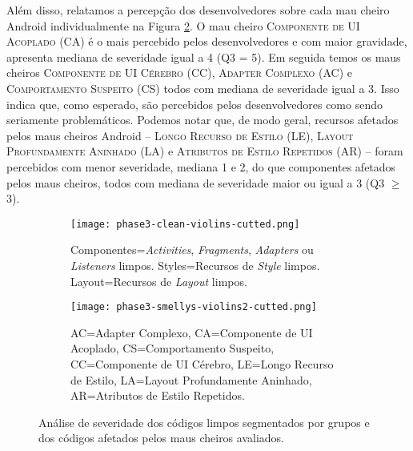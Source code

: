 Além disso, relatamos a percepção dos desenvolvedores sobre cada mau cheiro Android individualmente na Figura \ref{fig:smellys-violins}. O mau cheiro \textsc{\small Componente de UI Acoplado} (CA) é o mais percebido pelos desenvolvedores e com maior gravidade, apresenta mediana de severidade igual a 4 (Q3 = 5). Em seguida temos os maus cheiros \textsc{\small Componente de UI Cérebro} (CC), \textsc{\small Adapter Complexo} (AC) e \textsc{\small Comportamento Suspeito} (CS) todos com mediana de severidade igual a 3. Isso indica que, como esperado, são percebidos pelos desenvolvedores como sendo seriamente problemáticos. Podemos notar que, de modo geral, recursos afetados pelos maus cheiros Android -- \textsc{\small Longo Recurso de Estilo} (LE), \textsc{\small Layout Profundamente Aninhado} (LA) e \textsc{\small Atributos de Estilo Repetidos} (AR) -- foram percebidos com menor severidade, mediana 1 e 2, do que componentes afetados pelos maus cheiros, todos com mediana de severidade maior ou igual a 3 (Q3 $\geq$ 3).  \\


\begin{figure*}[!htb]
\centering
{}\textwidth
\captionsetup[subfigure]{width=.9\imagewidth,justification=raggedright}%
\begin{subfigure}[t]{.48\textwidth}\centering
  \hspace*{-1cm}%
  \texttt{[image: phase3-clean-violins-cutted.png]}
  \caption{Componentes=\textit{Activities}, \textit{Fragments}, \textit{Adapters} ou \textit{Listeners} limpos. Styles=Recursos de \textit{Style} limpos. Layout=Recursos de \textit{Layout} limpos.}
  \label{fig:clean-violins}
\end{subfigure}
\begin{subfigure}[t]{.48\textwidth}\centering
  \texttt{[image: phase3-smellys-violins2-cutted.png]}
  \caption{AC=Adapter Complexo, CA=Componente de UI Acoplado, CS=Comportamento Suspeito, CC=Componente de UI Cérebro, LE=Longo Recurso de Estilo, LA=Layout Profundamente Aninhado, AR=Atributos de Estilo Repetidos.}
  \label{fig:smellys-violins}
\end{subfigure}%
\caption{Análise de severidade dos códigos limpos segmentados por grupos e dos códigos afetados pelos maus cheiros avaliados.}
\label{fig:}
\end{figure*}


